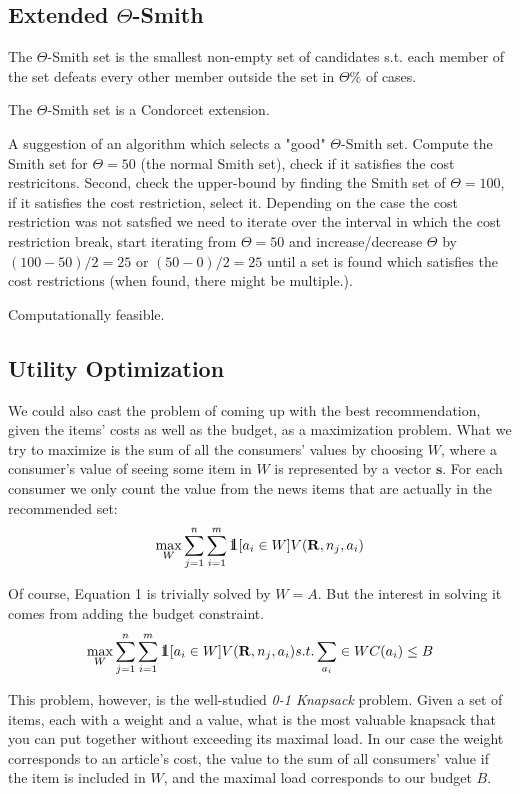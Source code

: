 \documentclass{article}
\def\one{\mbox{1\hspace{-4.25pt}\fontsize{12}{14.4}\selectfont\textrm{1}}} %
\begin{document}
\subsection{Extended $\Theta$-Smith}

The $\Theta$-Smith set is the smallest non-empty set of candidates s.t. each member of the set defeats every other member outside
 the set in $\Theta \%$ of cases.

 The $\Theta$-Smith set is a Condorcet extension.

A suggestion of an algorithm which selects a "good" $\Theta$-Smith set. Compute the Smith set for $\Theta=50$
(the normal Smith set), check if it satisfies the cost restricitons. Second, check the upper-bound by finding the Smith
set of $\Theta=100$, if it satisfies the cost restriction, select it. Depending on the case the cost restriction was not
satsfied we need to iterate over the interval in which the cost restriction break, start iterating from $\Theta=50$ and
 increase/decrease $\Theta$ by $(100-50)/2=25$ or $(50-0)/2=25$ until a set is found which satisfies the cost
 restrictions (when found, there might be multiple.).

Computationally feasible.

\subsection{Utility Optimization}
We could also cast the problem of coming up with the best recommendation, 
given the items' costs as well as the budget, as a maximization problem. 
What we try to maximize is the sum of all the consumers' values by choosing $W$, 
where a consumer's value of seeing some item in $W$ is represented by a vector $\mathbf{s}$. 
For each consumer we only count the value from the news items that are actually in the recommended set:\\
\begin{equation}
\max_W \sum_{j=1}^n \sum_{i=1}^m \one [a_i\in W] V(\mathbf{R}, n_j, a_i)
\end{equation}

Of course, Equation 1 is trivially solved by $W=A$. 
But the interest in solving it comes from adding the budget constraint.
\begin{equation}
\max_W \sum_{j=1}^n \sum_{i=1}^m \one [ a_i \in W ]
 V( \mathbf{R}, n_j, a_i) 
 { s.t. } \sum_{a_i} \in W C(a_i) \leq B
\end{equation}

This problem, however, is the well-studied {\em 0-1 Knapsack} problem. 
Given a set of items, each with a weight and a value, 
what is the most valuable knapsack that you can put together without exceeding its maximal load. 
In our case the weight corresponds to an article's cost, 
the value to the sum of all consumers' value if the item is included in $W$, 
and the maximal load corresponds to our budget $B$. 
\end{document}
